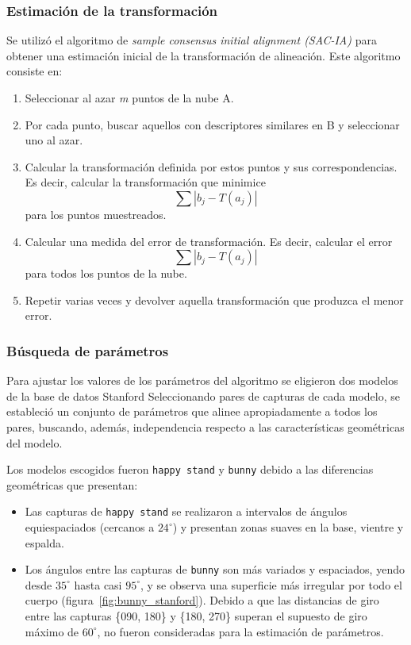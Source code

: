 		\subsubsection{Estimación de la transformación}
			Se utilizó el algoritmo de \emph{sample consensus initial alignment
			(SAC-IA)} para obtener una estimación inicial de la transformación de alineación.
			Este algoritmo consiste en:
			\begin{enumerate}
				\item Seleccionar al azar \emph{m} puntos de la nube A.
				\item Por cada punto, buscar aquellos con descriptores similares en B y seleccionar uno al azar.
				\item Calcular la transformación definida por estos puntos y sus correspondencias.
					Es decir, calcular la transformación que minimice
					\[ \sum |b_j - T(a_j)| \]
					para los puntos muestreados.
				\item Calcular una medida del error de transformación.
					Es decir, calcular el error
					\[ \sum |b_j - T(a_j)| \]
					para todos los puntos de la nube.
				\item Repetir varias veces y devolver aquella transformación que produzca el menor error.\cite{Rusu:2009:FPF:1703435.1703733}
			\end{enumerate}

		\subsubsection{Búsqueda de parámetros}
			Para ajustar los valores de los parámetros del algoritmo
			se eligieron dos modelos de la base de datos Stanford\cite{StanfordScanRep}
			Seleccionando pares de capturas de cada modelo, se estableció un conjunto de parámetros que alinee apropiadamente a todos los pares,
			buscando, además, independencia respecto a las características geométricas del modelo.

			Los modelos escogidos fueron \texttt{happy stand} y \texttt{bunny} debido a las diferencias geométricas que presentan:
			\begin{itemize}
				\item Las capturas de \texttt{happy stand} se realizaron a intervalos de ángulos equiespaciados (cercanos a $24^{\circ}$) y
					presentan zonas suaves en la base, vientre y espalda.
				\item Los ángulos entre las capturas de \texttt{bunny} son más variados y espaciados,
                    yendo desde $35^{\circ}$ hasta casi $95^{\circ}$,
                    y se observa una superficie más irregular por todo el cuerpo (figura~\ref{fig:bunny_stanford}).
                    Debido a que las distancias de giro entre las capturas \{090, 180\} y \{180, 270\}
                    superan el supuesto de giro máximo de $60^{\circ}$,
                    no fueron consideradas para la estimación de parámetros.
			\end{itemize}

